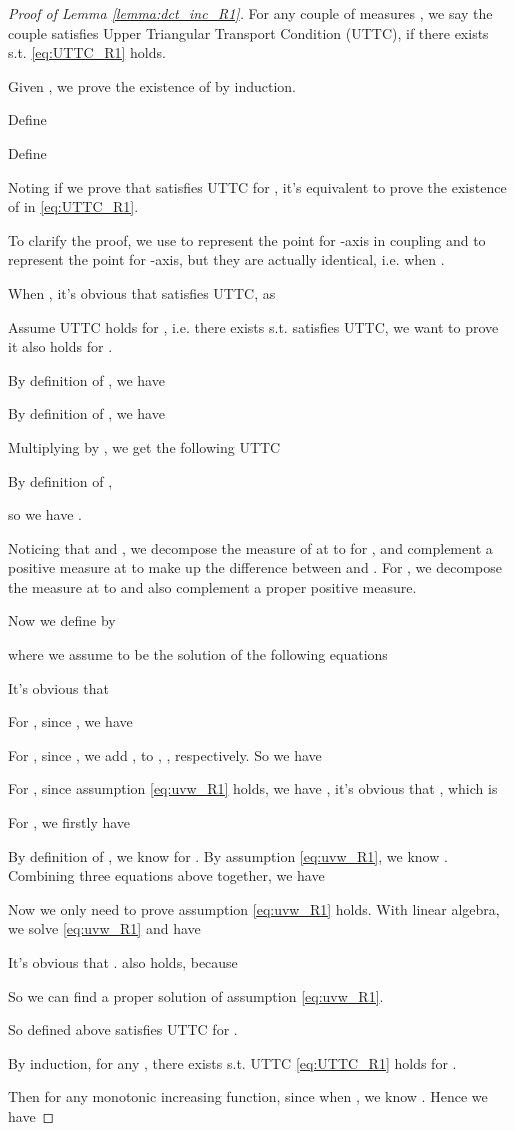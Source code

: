 \documentclass[nohyperref]{article}
\theoremstyle{plain}
\begin{document}
\begin{proof}[Proof of Lemma \ref{lemma:dct_inc_R1}]

For any couple of measures , we say the couple satisfies Upper Triangular Transport Condition (UTTC), if there exists  s.t. \eqref{eq:UTTC_R1} holds.

Given , we prove the existence of  by induction.

Define 


Define
 

Noting if we prove that  satisfies UTTC for , it's equivalent to prove the existence of  in \eqref{eq:UTTC_R1}.

To clarify the proof, we use  to represent the point for -axis in coupling and  to represent the point for -axis, but they are actually identical, i.e.  when . 

When , it's obvious that  satisfies UTTC, as


Assume UTTC holds for , i.e. there exists  s.t.  satisfies UTTC, we want to prove it also holds for .

By definition of , we have


By definition of , we have


Multiplying  by , we get the following UTTC


By definition of ,

so we have .

Noticing that  and , we decompose the measure of  at  to  for , and complement a positive measure at  to make up the difference between  and .
For , we decompose the measure at  to  and also complement a proper positive measure.

Now we define  by

where we assume  to be the solution of the following equations


It's obvious that 


For , since , we have 


For , since , we add ,  to , , respectively.
So we have 


For , since assumption \eqref{eq:uvw_R1} holds, we have , it's obvious that , which is 


For , we firstly have

By definition of , we know  for .
By assumption \eqref{eq:uvw_R1}, we know .
Combining three equations above together, we have


Now we only need to prove assumption \eqref{eq:uvw_R1} holds.
With linear algebra, we solve \eqref{eq:uvw_R1} and have


It's obvious that . 
 also holds, because


So we can find a proper solution of assumption \eqref{eq:uvw_R1}.

So  defined above satisfies UTTC for .

By induction, for any , there exists  s.t. UTTC \eqref{eq:UTTC_R1} holds for .

Then for any monotonic increasing function, since  when , we know .
Hence we have


\end{proof}
\end{document}
